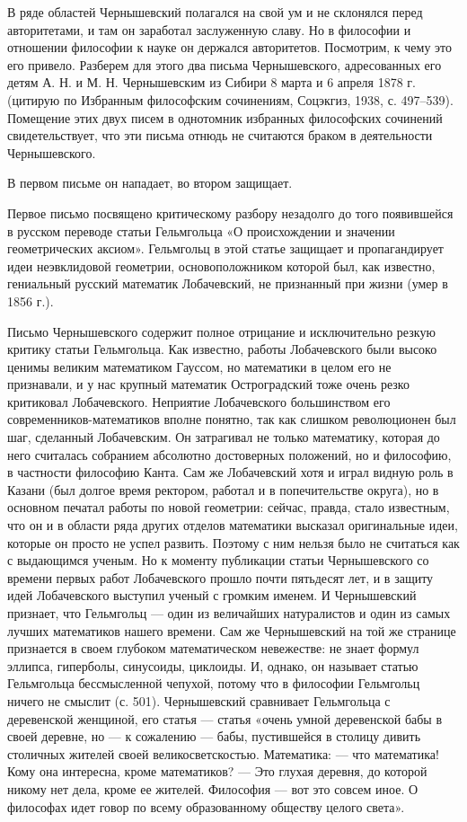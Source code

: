 В ряде областей Чернышевский полагался на свой ум и не склонялся перед
авторитетами, и там  он заработал заслуженную славу. Но  в философии и
отношении  философии к  науке  он держался  авторитетов. Посмотрим,  к
чему это  его привело.  Разберем для  этого два  письма Чернышевского,
адресованных его детям А. Н. и М.  Н. Чернышевским из Сибири 8 марта и
6  апреля  1878  г.  (цитирую  по  Избранным  философским  сочинениям,
Соцэкгиз, 1938, с.  497--539). Помещение этих двух  писем в однотомник
избранных философских сочинений свидетельствует, что эти письма отнюдь
не считаются браком в деятельности Чернышевского.

В первом письме он нападает, во втором защищает.

Первое  письмо  посвящено  критическому   разбору  незадолго  до  того
появившейся в  русском переводе статьи Гельмгольца  «О происхождении и
значении геометрических  аксиом». Гельмгольц в этой  статье защищает и
пропагандирует идеи  неэвклидовой геометрии,  основоположником которой
был,  как  известно,  гениальный  русский  математик  Лобачевский,  не
признанный при жизни (умер в 1856 г.).

Письмо Чернышевского содержит полное  отрицание и исключительно резкую
критику  статьи Гельмгольца.  Как известно,  работы Лобачевского  были
высоко ценимы великим  математиком Гауссом, но математики  в целом его
не  признавали, и  у нас  крупный математик  Остроградский тоже  очень
резко критиковал Лобачевского. Неприятие Лобачевского большинством его
современников-математиков вполне понятно, так как слишком революционен
был шаг,  сделанный Лобачевским.  Он затрагивал не  только математику,
которая до  него считалась собранием абсолютно  достоверных положений,
но и философию, в частности философию Канта. Сам же Лобачевский хотя и
играл  видную роль  в Казани  (был  долгое время  ректором, работал  и
в  попечительстве  округа), но  в  основном  печатал работы  по  новой
геометрии: сейчас,  правда, стало известным,  что он и в  области ряда
других  отделов  математики  высказал оригинальные  идеи,  которые  он
просто не успел развить. Поэтому с  ним нельзя было не считаться как с
выдающимся  ученым.  Но  к  моменту  публикации  статьи  Чернышевского
со  времени  первых работ  Лобачевского  прошло  почти пятьдесят  лет,
и  в  защиту  идей  Лобачевского выступил  ученый  с  громким  именем.
И  Чернышевский  признает,  что  Гельмгольц  ---  один  из  величайших
натуралистов и  один из самых  лучших математиков нашего  времени. Сам
же  Чернышевский  на  той  же странице  признается  в  своем  глубоком
математическом  невежестве:   не  знает  формул   эллипса,  гиперболы,
синусоиды,  циклоиды.  И,  однако,   он  называет  статью  Гельмгольца
бессмысленной  чепухой, потому  что в  философии Гельмгольц  ничего не
смыслит (с.  501). Чернышевский  сравнивает Гельмгольца  с деревенской
женщиной,  его  статья ---  статья  «очень  умной деревенской  бабы  в
своей  деревне, но  --- к  сожалению ---  бабы, пустившейся  в столицу
дивить столичных жителей своей  великосветскостью. Математика: --- что
математика!  Кому она  интересна,  кроме математиков?  --- Это  глухая
деревня, до которой  никому нет дела, кроме ее  жителей. Философия ---
вот это  совсем иное.  О философах идет  говор по  всему образованному
обществу целого света».


